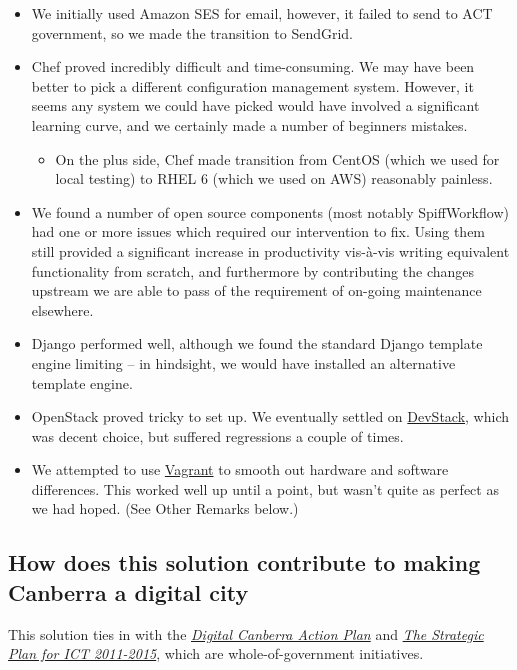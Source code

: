 \documentclass[12pt,a4paper,twosided]{article}
\begin{document}
\begin{itemize}

\item
  We initially used Amazon SES for email, however, it failed to send to
  ACT government, so we made the transition to SendGrid.
\item
  Chef proved incredibly difficult and time-consuming. We may have been
  better to pick a different configuration management system. However,
  it seems any system we could have picked would have involved a
  significant learning curve, and we certainly made a number of
  beginners mistakes.

  \begin{itemize}
  
  \item
    On the plus side, Chef made transition from CentOS (which we used
    for local testing) to RHEL 6 (which we used on AWS) reasonably
    painless.
  \end{itemize}
\item
  We found a number of open source components (most notably SpiffWorkflow) had
  one or more issues which required our intervention to fix. Using them
  still provided a significant increase in productivity vis-\`{a}-vis
  writing equivalent functionality from scratch, and furthermore by
  contributing the changes upstream we are able to pass of the
  requirement of on-going maintenance elsewhere.
\item
  Django performed well, although we found the standard Django template engine
  limiting -- in hindsight, we would have installed an alternative template engine.
\item
  OpenStack proved tricky to set up. We eventually settled on
  \href{http://devstack.org/}{DevStack}, which was decent choice, but
  suffered regressions a couple of times.
\item
  We attempted to use \href{http://www.vagrantup.com/}{Vagrant} to
  smooth out hardware and software differences. This worked well up
  until a point, but wasn't quite as perfect as we had hoped. (See Other
  Remarks below.)
\end{itemize}

\subsection{How does this solution contribute to making Canberra a
digital city}

This solution ties in with the
\emph{\href{http://www.cmd.act.gov.au/policystrategic/digitalcanberra/actionplan}{Digital
Canberra Action Plan}} and
\emph{\href{http://www.cmd.act.gov.au/__data/assets/pdf_file/0011/247826/The_Strategic_Plan_for_ICT_2011-15.pdf}{The
Strategic Plan for ICT 2011-2015}}, which are whole-of-government
initiatives.
\end{document}
